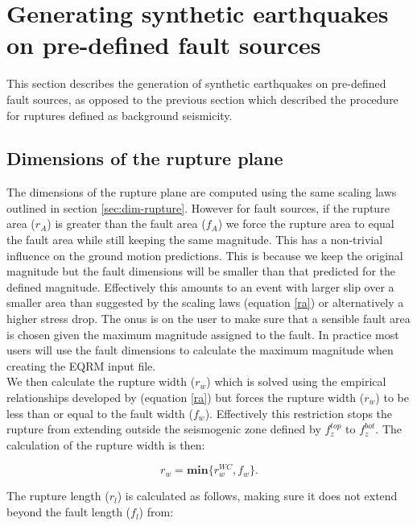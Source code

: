 \section{Generating synthetic earthquakes on pre-defined fault sources}
\label{sec:fault_gen}

This section describes the generation of synthetic earthquakes on pre-defined fault sources, as opposed to the previous section which described the procedure 
for ruptures defined as background seismicity.

\subsection{Dimensions of the rupture plane}
\label{sec:rup_dimn}

The dimensions of the rupture plane are computed using the same scaling laws outlined in section \ref{sec:dim-rupture}. However for fault sources, if the rupture area ($r_A$) 
is greater than the fault area ($f_A$) we force the rupture area to equal the fault area while still keeping the same magnitude. 
This has a non-trivial influence on the ground motion predictions.  
This is because we keep the original magnitude but the fault dimensions will be smaller than that predicted for the defined magnitude. Effectively this 
amounts to an event with larger slip over a smaller area
than suggested by the scaling laws (equation \ref{ra}) or alternatively a higher stress drop. The onus is on the user to make sure that a sensible fault area is chosen given 
the maximum magnitude assigned to the fault. In practice most users will use the fault dimensions to calculate the maximum magnitude
when creating the EQRM input file. \\

We then calculate the rupture width ($r_w$) which is solved using the empirical relationships developed by \citet{eqrm_Wells94} (equation \ref{ra})
but forces the rupture width ($r_w$) to be less than or equal to the fault width ($f_w$). Effectively this restriction stops the rupture from extending 
outside the seismogenic zone defined by $f_z^{top}$ to $f_z^{bot}$. The calculation of the rupture width is then:

\begin{equation} \label{eq:rw}
r_w = \mathbf{min}\{r_w^{WC}, f_w\} .
\end{equation}

The rupture length ($r_l$) is calculated as follows, making sure it does not extend beyond the fault length ($f_l$) from:

